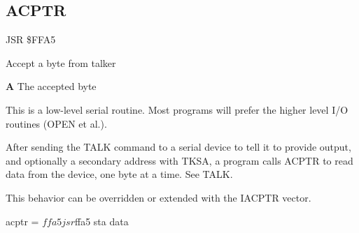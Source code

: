 

\newpage
\subsection{ACPTR}
\label{KERNAL Jump Table!ACPTR}
\begin{description}[leftmargin=2cm,style=nextline]
    \item [Address:] JSR \$FFA5
    \item [Description:] Accept a byte from talker
    \item [Outputs:]
        \textbf{A} The accepted byte
    \item [Remarks:]
        This is a low-level serial routine. Most programs will prefer the higher level I/O routines (OPEN et al.).

        After sending the TALK command to a serial device to tell it to provide output, and optionally a secondary address with TKSA, a program calls ACPTR to read data from the device, one byte at a time. See TALK.

        This behavior can be overridden or extended with the IACPTR vector.
    \item [Example:]
        \begin{asmcode}
acptr = $ffa5

    jsr $ffa5
    sta data
        \end{asmcode}
\end{description}



\newpage
